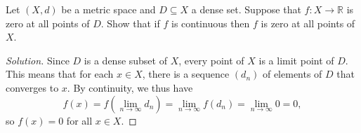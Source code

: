 \documentclass[11pt]{scrartcl}
\providecommand{\RR}{\mathbb R}
\newenvironment{soln}{\begin{proof}[Solution]}{\end{proof}}
\begin{document}
\begin{problem}
	Let $(X, d)$ be a metric space and $D\subseteq X$ a dense set.
	Suppose that $f\colon X\to\RR$ is zero at all points of $D$.
	Show that if $f$ is continuous
	then $f$ is zero at all points of $X$.
\end{problem}

\begin{soln}
	Since $D$ is a dense subset of $X$,
	every point of $X$ is a limit point of $D$.
	This means that for each $x\in X$, there is a sequence
	$(d_n)$ of elements of $D$ that converges to $x$.
	By continuity, we thus have
	\[f(x) = f\left(\lim_{n\to\infty} d_n\right) =
	\lim_{n\to\infty} f(d_n) = \lim_{n\to\infty} 0 = 0,\]
	so $f(x) = 0$ for all $x\in X$.
\end{soln}
\end{document}
